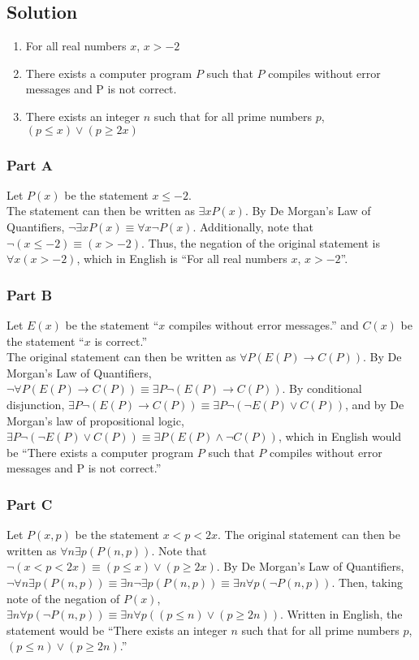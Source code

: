 \documentclass[table]{article}
\begin{document}
\subsection{Solution}
\begin{enumerate}[nosep, label=\alph*)]
\item For all real numbers $x$, $x > -2$
\item There exists a computer program $P$ such that $P$ compiles without error messages and P is not correct.
\item There exists an integer $n$ such that for all prime numbers $p$, $(p \leq x) \lor (p \geq 2x)$
\end{enumerate}
\subsubsection{Part A}
Let $P(x)$ be the statement $x \leq -2$.\\
The statement can then be written as $\exists xP(x)$. By De Morgan's Law of Quantifiers, $\neg \exists xP(x) \equiv \forall x \neg P(x)$. Additionally, note that $\neg(x \leq -2) \equiv (x > -2)$. Thus, the negation of the original statement is $\forall x(x > -2)$, which in English is ``For all real numbers $x$, $x > -2$''.
\subsubsection{Part B}
Let $E(x)$ be the statement ``$x$ compiles without error messages.'' and $C(x)$ be the statement ``$x$ is correct.''\\
The original statement can then be written as $\forall P(E(P) \rightarrow C(P))$. By De Morgan's Law of Quantifiers, $\neg \forall P(E(P) \rightarrow C(P)) \equiv \exists P \neg (E(P) \rightarrow C(P))$. By conditional disjunction, $\exists P \neg (E(P) \rightarrow C(P)) \equiv \exists P \neg (\neg E(P) \lor C(P))$, and by De Morgan's law of propositional logic, $\exists P \neg (\neg E(P) \lor C(P)) \equiv\exists P (E(P) \land \neg C(P))$, which in English would be ``There exists a computer program $P$ such that $P$ compiles without error messages and P is not correct.''
\subsubsection{Part C}
Let $P(x, p)$ be the statement $x < p < 2x$. The original statement can then be written as $\forall n \exists p(P(n, p))$. Note that $\neg(x < p < 2x) \equiv (p \leq x) \lor (p \geq 2x)$. By De Morgan's Law of Quantifiers,$\neg \forall n \exists p(P(n, p)) \equiv \exists n \neg \exists p(P(n, p)) \equiv \exists n \forall p(\neg P(n, p))$. Then, taking note of the negation of $P(x)$, $\exists n \forall p(\neg P(n, p)) \equiv \exists n \forall p((p \leq n) \lor (p \geq 2n))$. Written in English, the statement would be ``There exists an integer $n$ such that for all prime numbers $p$, $(p \leq n) \lor (p \geq 2n)$.''
\end{document}
